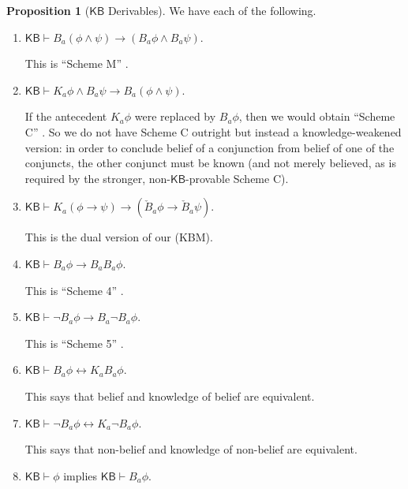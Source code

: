 \documentclass[12pt]{article}
\theoremstyle{definition}
\newtheorem{proposition}[theorem]{Proposition}
\newcommand{\KB}{{\mathsf{KB}}}                        %
\begin{document}
\begin{proposition}[$\KB$ Derivables]
  \label{prop:KBgt-derivables}
  We have each of the following.
  \begin{enumerate}
  \item $\KB\vdash B_a(\phi\land\psi)\to(B_a\phi\land B_a\psi)$.
    \label{derivables:Band-andB}

    This is ``Scheme M'' \cite[Ch.~8]{Chellas:ml}.

  \item $\KB\vdash K_a\phi\land B_a\psi\to B_a(\phi\land\psi)$.
    \label{derivables:andB-Band}

    If the antecedent $K_a\phi$ were replaced by $B_a\phi$, then we
    would obtain ``Scheme C'' \cite[Ch.~8]{Chellas:ml}.  So we do not
    have Scheme C outright but instead a knowledge-weakened version:
    in order to conclude belief of a conjunction from belief of one of
    the conjuncts, the other conjunct must be known (and not merely
    believed, as is required by the stronger, non-$\KB$-provable
    Scheme C).

  \item $\KB\vdash K_a(\phi\to\psi)\to(\check B_a\phi\to\check B_a\psi)$.
    \label{derivables:check-M}

    This is the dual version of our (KBM).

    \item $\KB\vdash B_a\phi\to B_aB_a\phi$.
    \label{derivables:pos-belief}

    This is ``Scheme 4'' \cite[Ch.~8]{Chellas:ml}.

  \item $\KB\vdash \lnot B_a\phi\to B_a\lnot B_a\phi$.
    \label{derivables:neg-belief}

    This is ``Scheme 5'' \cite[Ch.~8]{Chellas:ml}.

  \item $\KB\vdash B_a\phi\leftrightarrow K_aB_a\phi$.
    \label{derivables:B-KB}

    This says that belief and knowledge of belief are equivalent.

  \item $\KB\vdash \lnot B_a\phi\leftrightarrow K_a\lnot B_a\phi$.
    \label{derivables:nB-KnB}

    This says that non-belief and knowledge of non-belief are equivalent.

  \item $\KB\vdash\phi$ implies $\KB\vdash B_a\phi$.
    \label{derivables:B-nec}


\end{enumerate}
\end{proposition}
\end{document}
